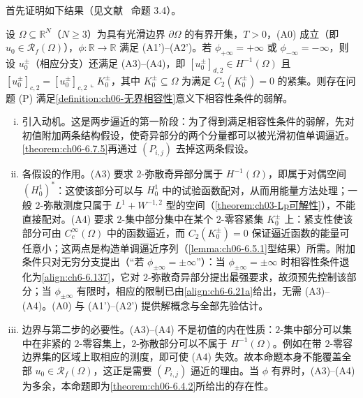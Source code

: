 \documentclass[../../main.tex]{subfiles}%
\begin{document}
首先证明如下结果（见文献~\cite{ref87} 命题 3.4）。

\begin{proposition}\label{proposition:ch06-6.7.4}
设 $\Omega\subseteq\mathbb{R}^N$（$N\geqslant3$）为具有光滑边界 $\partial\Omega$ 的有界开集，$T>0$，(A0) 成立（即 $u_0\in\mathscr{R}_f(\Omega)$），$\phi:\mathbb{R}\to\mathbb{R}$ 满足 (A1')--(A2')。若 $\phi_{+\infty}=+\infty$ 或 $\phi_{-\infty}=-\infty$，则设 $u^\pm_0$（相应分支）还满足 (A3)--(A4)，即 $[u^\pm_0]_{d,2}\in H^{-1}(\Omega)$ 且 $[u^\pm_0]_{c,2}=[u^\pm_0]_{c,2}\llcorner K^\pm_0$，其中 $K^\pm_0\subseteq\Omega$ 为满足 $C_2(K^\pm_0)=0$ 的紧集。则存在问题 (P) 满足\cref{definition:ch06-无界相容性}意义下相容性条件的弱解。
\end{proposition}

\begin{remark}\label{remark:ch06-6.7.4动机}
\begin{enumerate}[(i)]
\item 引入动机。这是两步逼近的第一阶段：为了得到满足相容性条件的弱解，先对初值附加两条结构假设，使奇异部分的两个分量都可以被光滑初值单调逼近。\cref{theorem:ch06-6.7.5}再通过 $(P_{i,j})$ 去掉这两条假设。

\item 各假设的作用。(A3) 要求 $2$-弥散奇异部分属于 $H^{-1}(\Omega)$，即属于对偶空间 $(H^1_0)^*$：这使该部分可以与 $H^1_0$ 中的试验函数配对，从而用能量方法处理；一般 $2$-弥散测度只属于 $L^1+W^{-1,2}$ 型的空间（\cref{theorem:ch03-Lp可解性}），不能直接配对。(A4) 要求 $2$-集中部分集中在某个 $2$-零容紧集 $K^\pm_0$ 上：紧支性使该部分可由 $C^\infty_c(\Omega)$ 中的函数逼近，而 $C_2(K^\pm_0)=0$ 保证逼近函数的能量可任意小；这两点是构造单调逼近序列（\cref{lemma:ch06-6.5.1}型结果）所需。附加条件只对无穷分支提出（“若 $\phi_{\pm\infty}=\pm\infty$”）：当 $\phi_{\pm\infty}=\pm\infty$ 时相容性条件退化为\eqref{align:ch6-6.137}，它对 $2$-弥散奇异部分提出最强要求，故须预先控制该部分；当 $\phi_{\pm\infty}$ 有限时，相应的限制已由\eqref{align:ch6-6.21a}给出，无需 (A3)--(A4)。(A0) 与 (A1')--(A2') 提供解概念与全部先验估计。

\item 边界与第二步的必要性。(A3)--(A4) 不是初值的内在性质：$2$-集中部分可以集中在非紧的 $2$-零容集上，$2$-弥散部分可以不属于 $H^{-1}(\Omega)$。例如在带 $2$-零容边界集的区域上取相应的测度，即可使 (A4) 失效。故本命题本身不能覆盖全部 $u_0\in\mathscr{R}_f(\Omega)$，这正是需要 $(P_{i,j})$ 逼近的理由。当 $\phi$ 有界时，(A3)--(A4) 为多余，本命题即为\cref{theorem:ch06-6.4.2}所给出的存在性。
\end{enumerate}
\end{remark}
\end{document}
